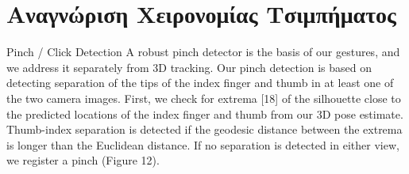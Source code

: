 \section{Αναγνώριση Χειρονομίας Τσιμπήματος}

Pinch / Click Detection A robust pinch detector is the basis
of our gestures, and we address it separately from 3D tracking.
Our pinch detection is based on detecting separation of
the tips of the index finger and thumb in at least one of the
two camera images. First, we check for extrema [18] of the
silhouette close to the predicted locations of the index finger
and thumb from our 3D pose estimate. Thumb-index separation
is detected if the geodesic distance between the extrema
is longer than the Euclidean distance. If no separation is detected
in either view, we register a pinch (Figure 12).



